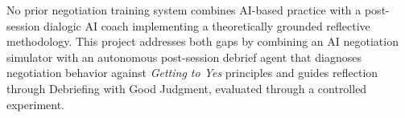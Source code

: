 No prior negotiation training system combines AI-based practice with a post-session dialogic AI coach implementing a theoretically grounded reflective methodology. This project addresses both gaps by combining an AI negotiation simulator with an autonomous post-session debrief agent that diagnoses negotiation behavior against \textit{Getting to Yes} principles \citep{fisher1981} and guides reflection through Debriefing with Good Judgment, evaluated through a controlled experiment.
